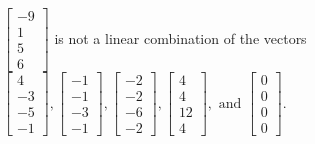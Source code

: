 \begin{exercise}
\begin{exerciseStatement}
  \end{exerciseStatement}
  \begin{exerciseAnswer}
   \(\left[\begin{array}{c}
-9 \\
1 \\
5 \\
6
\end{array}\right]\) 
  	 is not  
	a linear combination of the vectors \(\left[\begin{array}{c}
4 \\
-3 \\
-5 \\
-1
\end{array}\right] , \left[\begin{array}{c}
-1 \\
-1 \\
-3 \\
-1
\end{array}\right] , \left[\begin{array}{c}
-2 \\
-2 \\
-6 \\
-2
\end{array}\right] , \left[\begin{array}{c}
4 \\
4 \\
12 \\
4
\end{array}\right] , \text{ and } \left[\begin{array}{c}
0 \\
0 \\
0 \\
0
\end{array}\right]\).

	
  


  \end{exerciseAnswer}
\end{exercise}